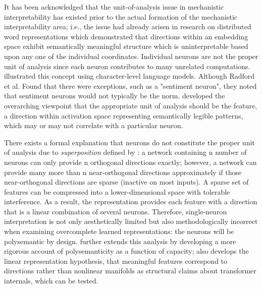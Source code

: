 It has been acknowledged that the unit-of-analysis issue in mechanistic interpretability has existed prior to the actual formation of the mechanistic interpretability area; i.e., the issue had already arisen in research on distributed word representations \parencite{mikolov_efficient_2013} which demonstrated that directions within an embedding space exhibit semantically meaningful structure which is uninterpretable based upon any one of the individual coordinates. Individual neurons are not the proper unit of analysis since each neuron contributes to many unrelated computations. \textcite{radford_learning_2017} illustrated this concept using character-level language models. Although Radford et al. Found that there were exceptions, such as a "sentiment neuron", they noted that sentiment neurons would not typically be the norm. \textcite{olah_feature_2017, olah_zoom_2020} developed the overarching viewpoint that the appropriate unit of analysis should be the feature, a direction within activation space representing semantically legible patterns, which may or may not correlate with a particular neuron.

There exists a formal explanation that neurons do not constitute the proper unit of analysis due to \emph{superposition} defined by \textcite{elhage_toy_2022}: a network containing n number of neurons can only provide n orthogonal directions exactly; however, a network can provide many more than n near-orthogonal directions approximately if those near-orthogonal directions are sparse (inactive on most inputs). A sparse set of features can be compressed into a lower-dimensional space with tolerable interference. As a result, the representation provides each feature with a direction that is a linear combination of several neurons. Therefore, single-neuron interpretation is not only aesthetically limited but also methodologically incorrect when examining overcomplete learned representations: the neurons will be polysemantic by design. \textcite{scherlis_polysemanticity_2025} further extends this analysis by developing a more rigorous account of polysemanticity as a function of capacity; \textcite{park_linear_2024} also develops the linear representation hypothesis, that meaningful features correspond to directions rather than nonlinear manifolds as structural claims about transformer internals, which can be tested.

